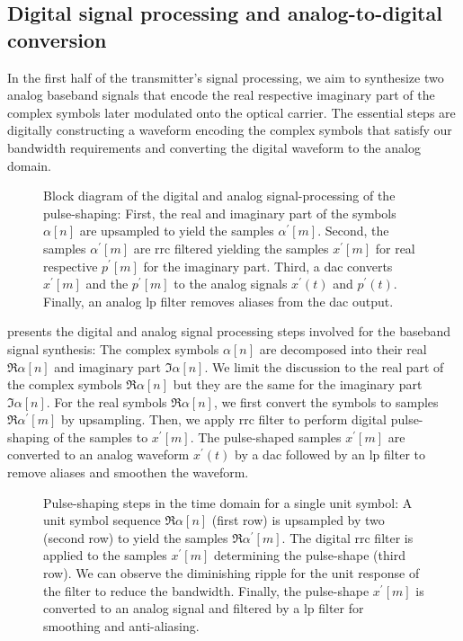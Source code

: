 \subsection{Digital signal processing and analog-to-digital conversion}

In the first half of the transmitter's signal processing, we aim to synthesize two analog baseband signals that encode the real respective imaginary part of the complex symbols later modulated onto the optical carrier.
The essential steps are digitally constructing a waveform encoding the complex symbols that satisfy our bandwidth requirements and converting the digital waveform to the analog domain.

\begin{figure}[htb]
	\centering
	
	\caption{Block diagram of the digital and analog signal-processing of the pulse-shaping: First, the real and imaginary part of the symbols $\alpha[n]$ are upsampled to yield the samples $\alpha^\prime[m]$. Second, the samples $\alpha^\prime[m]$ are \gls{rrc} filtered yielding the samples $x^\prime[m]$ for real respective $p^\prime[m]$ for the imaginary part. Third, a \gls{dac} converts $x^\prime[m]$ and the $p^\prime[m]$ to the analog signals $x^\prime(t)$ and $p^\prime(t)$. Finally, an analog \gls{lp} filter removes aliases from the \gls{dac} output.}\label{fig:pulse_shaping_block}
\end{figure}

 presents the digital and analog signal processing steps involved for the baseband signal synthesis:
The complex symbols $\alpha[n]$ are decomposed into their real $\Re\alpha[n]$ and imaginary part $\Im\alpha[n]$.
We limit the discussion to the real part of the complex symbols $\Re\alpha[n]$ but they are the same for the imaginary part $\Im\alpha[n]$.
For the real symbols $\Re\alpha[n]$, we first convert the symbols to samples $\Re\alpha^\prime[m]$ by upsampling.
Then, we apply \gls{rrc} filter to perform digital pulse-shaping of the samples to $x^\prime[m]$.
The pulse-shaped samples $x^\prime[m]$ are converted to an analog waveform $x^\prime(t)$ by a \gls{dac} followed by an \gls{lp} filter to remove aliases and smoothen the waveform.

\begin{figure}[htb]
	\centering
	
	\caption{Pulse-shaping steps in the time domain for a single unit symbol: A unit symbol sequence $\Re\alpha[n]$ (first row) is upsampled by two (second row) to yield the samples $\Re\alpha^\prime[m]$. The digital \gls{rrc} filter is applied to the samples $x^\prime[m]$ determining the pulse-shape (third row). We can observe the diminishing ripple for the unit response of the filter to reduce the bandwidth. Finally, the pulse-shape $x^\prime[m]$ is converted to an analog signal and filtered by a \gls{lp} filter for smoothing and anti-aliasing.}\label{fig:pulse_shaping_unit_time}
\end{figure}


